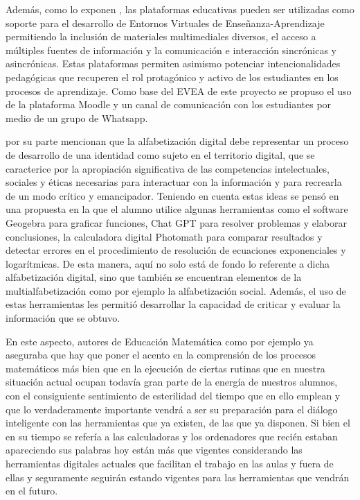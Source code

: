 Además, como lo exponen \textcite{galvis2013}, las plataformas educativas pueden ser utilizadas como soporte para el desarrollo de Entornos Virtuales de Enseñanza-Aprendizaje permitiendo la inclusión de materiales multimediales diversos, el acceso a múltiples fuentes de información y la comunicación e interacción sincrónicas y asincrónicas. Estas plataformas permiten asimismo potenciar intencionalidades pedagógicas que recuperen el rol protagónico y activo de los estudiantes en los procesos de aprendizaje. Como base del EVEA de este proyecto se propuso el uso de la plataforma Moodle y un canal de comunicación con los estudiantes por medio de un grupo de Whatsapp.

\textcite{area2012} por su parte mencionan que la alfabetización digital debe representar un proceso de desarrollo de una identidad como sujeto en el territorio digital, que se caracterice por la apropiación significativa de las competencias intelectuales, sociales y éticas necesarias para interactuar con la información y para recrearla de un modo crítico y emancipador. Teniendo en cuenta estas ideas se pensó en una propuesta en la que el alumno utilice algunas herramientas como el software Geogebra para graficar funciones, Chat GPT para resolver problemas y elaborar conclusiones, la calculadora digital Photomath para comparar resultados y detectar errores en el procedimiento de resolución de ecuaciones exponenciales y logarítmicas. De esta manera, aquí no solo está de fondo lo referente a dicha alfabetización digital, sino que también se encuentran elementos de la multialfabetización como por ejemplo la alfabetización social. Además, el uso de estas herramientas les permitió desarrollar la capacidad de criticar y evaluar la información que se obtuvo.

En este aspecto, autores de Educación Matemática como por ejemplo \textcite{deguzman2004} ya aseguraba que hay que poner el acento en la comprensión de los procesos matemáticos más bien que en la ejecución de ciertas rutinas que en nuestra situación actual ocupan todavía gran parte de la energía de nuestros alumnos, con el consiguiente sentimiento de esterilidad del tiempo que en ello emplean y que lo verdaderamente importante vendrá a ser su preparación para el diálogo inteligente con las herramientas que ya existen, de las que ya disponen. Si bien el en su tiempo se refería a las calculadoras y los ordenadores que recién estaban apareciendo sus palabras hoy están más que vigentes considerando las herramientas digitales actuales que facilitan el trabajo en las aulas y fuera de ellas y seguramente seguirán estando vigentes para las herramientas que vendrán en el futuro.

